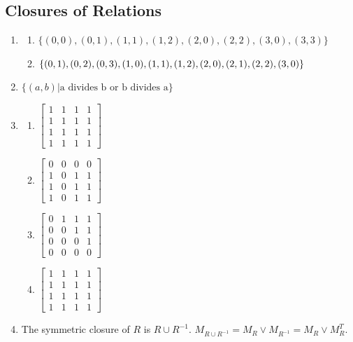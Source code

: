 \documentclass{sig-alternate-05-2015}
\begin{document}
\subsection{Closures of Relations}
\begin{enumerate}
\item 
	\begin{enumerate}
		\item $\{(0, 0), (0, 1), (1, 1), (1, 2), (2, 0), (2, 2), (3, 0), (3, 3)\}$
		\item $\{(0, 1), (0, 2), (0, 3), (1, 0), (1, 1), (1, 2), (2, 0), (2, 1),\\
			(2, 2), (3, 0)\}$
	\end{enumerate}

\item
$\{(a, b) | \text{a divides b or b divides a}\}$	

\item
	\begin{enumerate}
		\item 
		$\begin{bmatrix}
		1 & 1 & 1 & 1\\
		1 & 1 & 1 & 1\\
		1 & 1 & 1 & 1\\
		1 & 1 & 1 & 1
		\end{bmatrix}$
		\item
		$\begin{bmatrix}
		0 & 0 & 0 & 0\\
		1 & 0 & 1 & 1\\
		1 & 0 & 1 & 1\\
		1 & 0 & 1 & 1
		\end{bmatrix}$
		\item
		$\begin{bmatrix}
		0 & 1 & 1 & 1\\
		0 & 0 & 1 & 1\\
		0 & 0 & 0 & 1\\
		0 & 0 & 0 & 0
		\end{bmatrix}$
		\item
		$\begin{bmatrix}
		1 & 1 & 1 & 1\\
		1 & 1 & 1 & 1\\
		1 & 1 & 1 & 1\\
		1 & 1 & 1 & 1
		\end{bmatrix}$		
	\end{enumerate}
	
\item The symmetric closure of $R$ is $R \cup R^{-1}$. $M_{R \cup R^{-1}} = M_R \vee M_{R^{-1}} = M_R \vee M_R^T$.


\end{enumerate}
\end{document}
